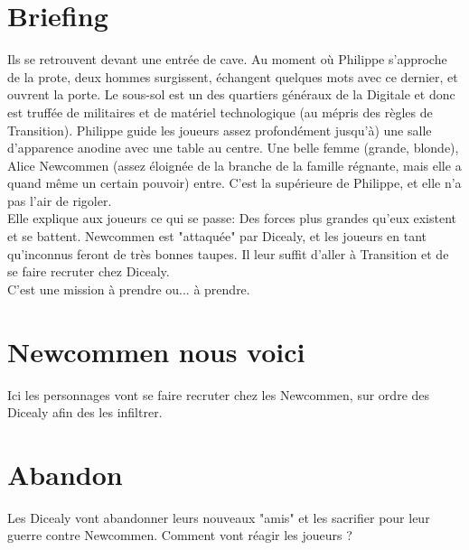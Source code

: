 \documentclass[10pt,a4paper,twocolumn]{article}
\begin{document}
\section{Briefing}

Ils se retrouvent devant une entrée de cave. Au moment où Philippe s'approche de la prote, deux hommes surgissent, échangent quelques mots avec ce dernier, et ouvrent la porte. Le sous-sol est un des quartiers généraux de la Digitale et donc est truffée de militaires et de matériel technologique (au mépris des règles de Transition). Philippe guide les joueurs assez profondément jusqu'à) une salle d'apparence anodine avec une table au centre. Une belle femme (grande, blonde), Alice Newcommen (assez éloignée de la branche de la famille régnante, mais elle a quand même un certain pouvoir) entre. C'est la supérieure de Philippe, et elle n'a pas l'air de rigoler.\\
Elle explique aux joueurs ce qui se passe: Des forces plus grandes qu'eux existent et se battent. Newcommen est "attaquée" par Dicealy, et les joueurs en tant qu'inconnus feront de très bonnes taupes. Il leur suffit d'aller à Transition et de se faire recruter chez Dicealy.
\\
C'est une mission à prendre ou... à prendre.

\section{Newcommen nous voici}
Ici les personnages vont se faire recruter chez les Newcommen, sur ordre des Dicealy afin des les infiltrer.

\section{Abandon}
Les Dicealy vont abandonner leurs nouveaux "amis" et les sacrifier pour leur guerre contre Newcommen. Comment vont réagir les joueurs ?
\newpage
\end{document}
